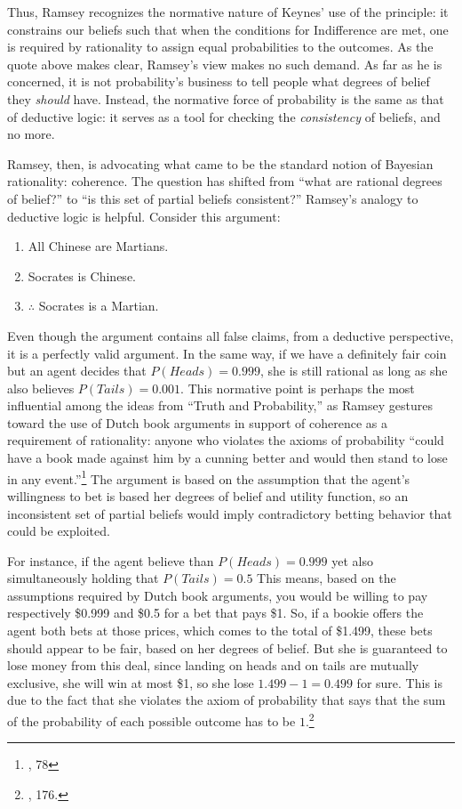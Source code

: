 Thus, Ramsey recognizes the normative nature of Keynes' use of the
principle: it constrains our beliefs such that when the conditions for
Indifference are met, one is required by rationality to assign equal probabilities to the outcomes. As the quote above
makes clear, Ramsey's view makes no such demand. As far as he is
concerned, it is not probability's business to tell people what degrees
of belief they \emph{should} have. Instead, the normative force of
probability is the same as that of deductive logic: it serves as a tool
for checking the \emph{consistency} of  beliefs, and no more.

Ramsey, then, is advocating what came to be the standard notion of
Bayesian rationality: coherence. The question has shifted from ``what
are rational degrees of belief?'' to ``is this set of partial beliefs
consistent?'' Ramsey's analogy to deductive logic is helpful. Consider
this argument:

\begin{enumerate}
	\item All Chinese are Martians.
	\item  Socrates is Chinese.
	\item  \(\therefore\) Socrates is a Martian.
\end{enumerate}

Even though the argument contains all false claims, from a deductive
perspective, it is a perfectly valid argument. In the same way, if we
have a definitely fair coin but an agent decides that
\(P(Heads)=0.999\), she is still rational as long as she also believes
\(P(Tails) = 0.001\). This normative point is perhaps the most
influential among the ideas from ``Truth and Probability,'' as Ramsey
gestures toward the use of Dutch book arguments in support of coherence
as a requirement of rationality: anyone who violates the axioms of
probability ``could have a book made against him by a cunning better and
would then stand to lose in any event.''\footnote{\cite{ramsey}, 78} The argument
is based on the assumption that the agent's willingness to bet is based
her degrees of belief and utility function, so an inconsistent set of
partial beliefs would imply contradictory betting behavior that could be
exploited.

For instance, if the agent believe than \(P(Heads) = 0.999\) yet also
simultaneously holding that \(P(Tails) = 0.5\) This means, based on the
assumptions required by Dutch book arguments, you would be willing to
pay respectively \$0.999 and \$0.5 for a bet that pays \$1. So, if a
bookie offers the agent both bets at those prices, which comes to the
total of \$1.499, these bets should appear to be fair, based on her
degrees of belief. But she is guaranteed to lose money from this deal,
since landing on heads and on tails are mutually exclusive, she will win
at most \$1, so she lose \(1.499 - 1 = 0.499\) for sure. This is due to
the fact that she violates the axiom of probability that says that the
sum of the probability of each possible outcome has to be
\(1\).\footnote{\cite{hajekdutchbook}, 176.}

